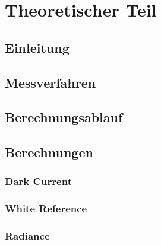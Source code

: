 \chapter{Theoretischer Teil}

\section{Einleitung}

\section{Messverfahren}

\section{Berechnungsablauf}

\section{Berechnungen}

\subsection{Dark Current}

\subsection{White Reference}

\subsection{Radiance}
